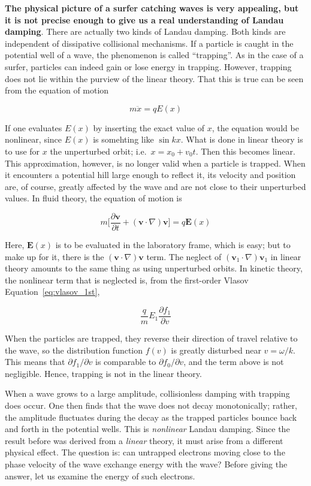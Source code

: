 \documentclass[
  notoc %
]{tufte-book}
\begin{document}
\textbf{The physical picture of a surfer catching waves is very
appealing, but it is not precise enough to give us a real understanding
of Landau damping}. There are actually two kinds of Landau damping. Both
kinds are independent of dissipative collisional mechanisms. If a
particle is caught in the potential well of a wave, the phenomenon is
called ``trapping''. As in the case of a surfer, particles can indeed
gain or lose energy in trapping. However, trapping does not lie within
the purview of the linear theory. That this is true can be seen from the
equation of motion

\[
m\ddot{x} = qE(x)
\]

If one evaluates \(E(x)\) by inserting the exact value of \(x\), the
equation would be nonlinear, since \(E(x)\) is somehting like
\(\sin kx\). What is done in linear theory is to use for \(x\) the
unperturbed orbit; i.e.~\(x=x_0 + v_0 t\). Then this becomes linear.
This approximation, however, is no longer valid when a particle is
trapped. When it encounters a potential hill large enough to reflect it,
its velocity and position are, of course, greatly affected by the wave
and are not close to their unperturbed values. In fluid theory, the
equation of motion is

\[
m\Big[ \frac{\partial\mathbf{v}}{\partial t}+(\mathbf{v}\cdot\nabla)\mathbf{v} \Big] = q\mathbf{E}(x)
\]

Here, \(\mathbf{E}(x)\) is to be evaluated in the laboratory frame,
which is easy; but to make up for it, there is the
\((\mathbf{v}\cdot\nabla)\mathbf{v}\) term. The neglect of
\((\mathbf{v}_1\cdot\nabla)\mathbf{v}_1\) in linear theory amounts to
the same thing as using unperturbed orbits. In kinetic theory, the
nonlinear term that is neglected is, from the first-order Vlasov
Equation~\ref{eq:vlasov_1st},

\[
\frac{q}{m}E_1\frac{\partial f_1}{\partial v}
\]

When the particles are trapped, they reverse their direction of travel
relative to the wave, so the distribution function \(f(v)\) is greatly
disturbed near \(v=\omega/k\). This means that
\(\partial f_1/\partial v\) is comparable to
\(\partial f_0/\partial v\), and the term above is not negligible.
Hence, trapping is not in the linear theory.

When a wave grows to a large amplitude, collisionless damping with
trapping does occur. One then finds that the wave does not decay
monotonically; rather, the amplitude fluctuates during the decay as the
trapped particles bounce back and forth in the potential wells. This is
\emph{nonlinear} Landau damping. Since the result before was derived
from a \emph{linear} theory, it must arise from a different physical
effect. The question is: can untrapped electrons moving close to the
phase velocity of the wave exchange energy with the wave? Before giving
the answer, let us examine the energy of such electrons.
\end{document}
